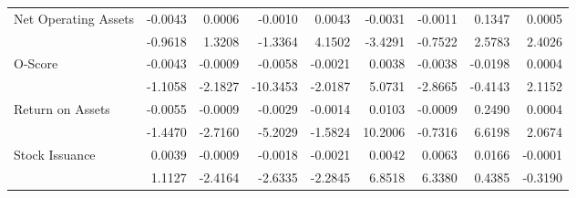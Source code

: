 \begin{table}[h]
{\begin{tabular}{@{}lrrrrrrrr@{}}
\multirow{2}{*}{Net Operating Assets} & -0.0043 & 0.0006 & -0.0010 & 0.0043 & -0.0031 & -0.0011 & 0.1347 & 0.0005 \\
& -0.9618 & 1.3208 & -1.3364 & 4.1502 & -3.4291 & -0.7522 & 2.5783 & 2.4026 \\
\multirow{2}{*}{O-Score} & -0.0043 & -0.0009 & -0.0058 & -0.0021 & 0.0038 & -0.0038 & -0.0198 & 0.0004 \\
& -1.1058 & -2.1827 & -10.3453 & -2.0187 & 5.0731 & -2.8665 & -0.4143 & 2.1152 \\
\multirow{2}{*}{Return on Assets} & -0.0055 & -0.0009 & -0.0029 & -0.0014 & 0.0103 & -0.0009 & 0.2490 & 0.0004 \\
& -1.4470 & -2.7160 & -5.2029 & -1.5824 & 10.2006 & -0.7316 & 6.6198 & 2.0674 \\
\multirow{2}{*}{Stock Issuance} & 0.0039 & -0.0009 & -0.0018 & -0.0021 & 0.0042 & 0.0063 & 0.0166 & -0.0001 \\
& 1.1127 & -2.4164 & -2.6335 & -2.2845 & 6.8518 & 6.3380 & 0.4385 & -0.3190 \\ \bottomrule
\end{tabular}%
}
\end{table}
